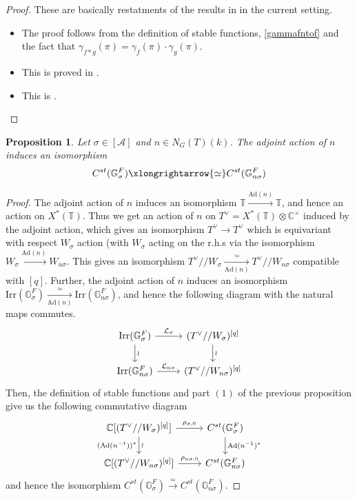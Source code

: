 \documentclass[11 pt]{article}
\numberwithin{equation}{subsection}
\newtheorem{proposition}[theorem]{Proposition}
\theoremstyle{definition}
\theoremstyle{remark}
\theoremstyle{conjecture}
\newcommand{\sA}{\mathscr A}
\newcommand{\Irr}{\mathrm{Irr}}
\newcommand{\Ad}{\mathrm{Ad}}
\newcommand{\T}{\mathbb T}
\newcommand{\C}{\mathbb C}
\newcommand{\G}{\mathbb G}
\newcommand{\mc}{\mathcal}
\begin{document}
\begin{proof}These are basically restatments of the results in \cite[Section 4.1]{cb24} in the current setting. 
    \begin{itemize}
        \item [(1)] The proof follows from the definition of stable functions, \eqref{gammafntof} and the fact that $\gamma_{f*g}(\pi)=\gamma_f(\pi)\cdot \gamma_g(\pi)$. 
        \item[(2)] This is proved in \cite[Proposition 4.2.2(4)]{laumon}. 
        \item[(3)] This is \cite[Theorem 4.2]{cb24}. 
    \end{itemize}
\end{proof}

\begin{proposition}
    Let $\sigma \in [\sA]$ and $n \in N_G(T)(k)$. The adjoint action of $n$ induces an isomorphism 
    \begin{equation*}
        C^{st}(\G^F_\sigma) \xlongrightarrow{\simeq} C^{st}(\G^F_{n\sigma})
    \end{equation*}
\end{proposition}
\begin{proof}
    The adjoint action of $n$ induces an isomorphism $\T \xrightarrow{\Ad(n)}\T$, and hence an action on $X^*(\T)$. Thus we get an action of $n$ on $T^\vee=X^*(\T)\otimes \C^\times$ induced by the adjoint action, which gives an isomorphism $ T^\vee \rightarrow T^\vee$ which is equivariant with respect $W_\sigma$ action (with $W_\sigma$ acting on the r.h.s via the isomorphism $W_\sigma \xrightarrow{\Ad(n)} W_{n\sigma}$. This gives an isomorphism $T^\vee // W_\sigma \xrightarrow[\Ad(n)]{\simeq}T^\vee//W_{n\sigma}$ compatible with $[q]$. Further, the adjoint action of $n$ induces an isomorphism $\Irr(\G_\sigma^F) \xrightarrow[\Ad(n)]{\simeq} \Irr(\G_{n\sigma}^F)$, and hence the following diagram with the natural maps commutes. 
    \begin{equation*}
        \begin{tikzcd}
            \Irr(\G_\sigma^F)\arrow{r}{\mc L_\sigma} \arrow{d}{\wr}&(T^\vee // W_\sigma)^{[q]}\arrow{d}{\wr}\\
            \Irr(\G_{n\sigma}^F) \arrow{r}{\mc L_{n\sigma}}& (T^\vee // W_{n\sigma})^{[q]}
        \end{tikzcd}
    \end{equation*}
    Then, the definition of stable functions and part $(1)$ of the previous proposition give us the following commutative diagram
     \begin{equation}\label{adjnstabledepth0}
        \begin{tikzcd}
            \C[(T^\vee // W_\sigma)^{[q]}]\arrow[d,"\wr", "(\Ad(n^{-1}))^*"'] \arrow{r}{\rho_{\sigma,0}} & C^{st}(\G^F_\sigma)\arrow{d}{\Ad(n^{-1})^*} \\
            \C[(T^\vee // W_{n\sigma})^{[q]}]\arrow{r}{\rho_{n\sigma,0}}& C^{st}(\G^F_{n\sigma})
        \end{tikzcd}
    \end{equation}
    and hence the isomorphism $C^{st}(\G^F_\sigma) \xrightarrow{\simeq} C^{st}(\G^F_{n\sigma})$.
\end{proof}
\end{document}
